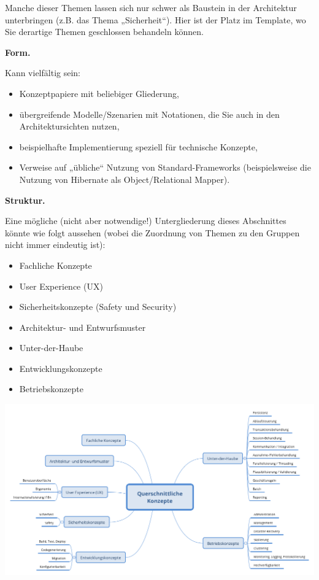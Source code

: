 \documentclass[]{article}
\begin{document}
Manche dieser Themen lassen sich nur schwer als Baustein in der
Architektur unterbringen (z.B. das Thema „Sicherheit``). Hier ist der
Platz im Template, wo Sie derartige Themen geschlossen behandeln können.

\textbf{Form.}

Kann vielfältig sein:

\begin{itemize}
\item
  Konzeptpapiere mit beliebiger Gliederung,
\item
  übergreifende Modelle/Szenarien mit Notationen, die Sie auch in den
  Architektursichten nutzen,
\item
  beispielhafte Implementierung speziell für technische Konzepte,
\item
  Verweise auf „übliche`` Nutzung von Standard-Frameworks
  (beispielsweise die Nutzung von Hibernate als Object/Relational
  Mapper).
\end{itemize}

\textbf{Struktur.}

Eine mögliche (nicht aber notwendige!) Untergliederung dieses
Abschnittes könnte wie folgt aussehen (wobei die Zuordnung von Themen zu
den Gruppen nicht immer eindeutig ist):

\begin{itemize}
\item
  Fachliche Konzepte
\item
  User Experience (UX)
\item
  Sicherheitskonzepte (Safety und Security)
\item
  Architektur- und Entwurfsmuster
\item
  Unter-der-Haube
\item
  Entwicklungskonzepte
\item
  Betriebskonzepte
\end{itemize}

\includegraphics{images/08-Crosscutting-Concepts-Structure-DE.png}
\end{document}
